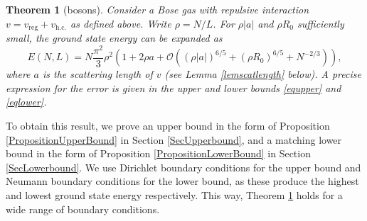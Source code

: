 \documentclass[a4paper,11pt]{article}
\newtheorem{theorem}{Theorem}
\numberwithin{equation}{section}
\begin{document}
\begin{theorem}[bosons]
\label{TheoremMain}
Consider a Bose gas with repulsive interaction  $v=v_{\text{reg}}+v_{\text{h.c.}}$ as defined above. Write $\rho=N/L$. For $\rho|a|$ and $\rho R_0$ sufficiently small, the ground state energy can be expanded as 
\begin{equation}
\label{result}
E(N,L)=N\frac{\pi^2}{3}\rho^2\left(1+2\rho a+
\mathcal{O}
\left((\rho|a|)^{6/5}+(\rho R_0)^{6/5}+N^{-2/3}\right)\right),
\end{equation}
where $a$ is the scattering length of $v$ (see Lemma \ref{lemscatlength} below). A precise expression for the error is given in the upper and lower bounds \eqref{equpper} and \eqref{eqlower}.
\end{theorem}
To obtain this result, we prove an upper bound in the form of Proposition \ref{PropositionUpperBound} in Section \ref{SecUpperbound}, and a matching lower bound in the form of Proposition \ref{PropositionLowerBound} in Section \ref{SecLowerbound}. We use Dirichlet boundary conditions for the upper bound and Neumann boundary conditions for the lower bound, as these produce the highest and lowest ground state energy respectively. This way, Theorem \ref{TheoremMain} holds for a wide range of boundary conditions. 
\end{document}
